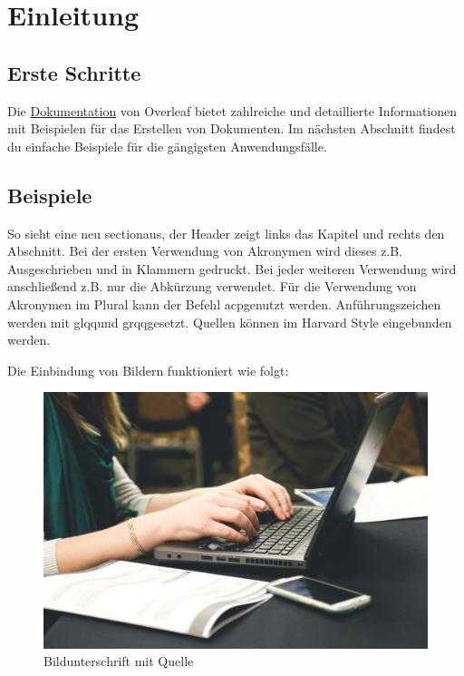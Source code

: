 
\chapter{Einleitung}
\section{Erste Schritte}
Die \href{https://www.overleaf.com/learn}{Dokumentation} von Overleaf bietet zahlreiche und detaillierte Informationen mit Beispielen für das Erstellen von Dokumenten. Im nächsten Abschnitt findest du einfache Beispiele für die gängigsten Anwendungsfälle.

\newpage

\section{Beispiele}
So sieht eine neu \glqq section\grqq \space aus, der Header zeigt links das Kapitel und rechts den Abschnitt. Bei der ersten Verwendung von Akronymen wird dieses \ac{z.B.} Ausgeschrieben und in Klammern gedruckt.
Bei jeder weiteren Verwendung wird anschließend \ac{z.B.} nur die Abkürzung verwendet. Für die Verwendung von Akronymen im Plural kann der Befehl \glqq acp\grqq \space genutzt werden. Anführungszeichen werden mit \glqq glqq\grqq \space und \glqq grqq\grqq \space gesetzt. Quellen können im Harvard Style eingebunden werden. \cite{buch}

Die Einbindung von Bildern funktioniert wie folgt:
\begin{figure}[h]
    \includegraphics[width=\textwidth]{Bilder/writing}
    \caption[Test Bild]{Bildunterschrift mit Quelle \cite{sonstiges}}
    \label{fig:laptop}
\end{figure}

